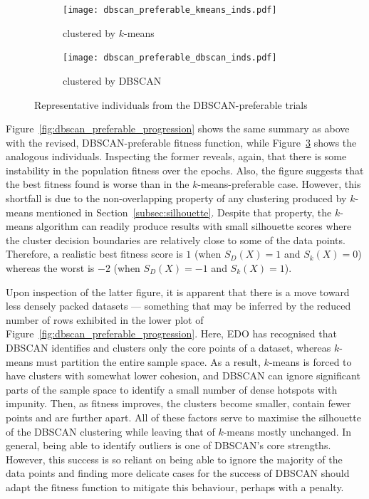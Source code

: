 \begin{figure}
    \centering
    \begin{subfigure}{\imgwidth}
        \centering
        \texttt{[image: dbscan\_preferable\_kmeans\_inds.pdf]}
        \caption{%
            clustered by \(k\)-means
        }\label{fig:dbscan_preferable_kmeans_inds}
    \end{subfigure}

    \vspace{1em}
    \begin{subfigure}{\imgwidth}
        \centering
        \texttt{[image: dbscan\_preferable\_dbscan\_inds.pdf]}
        \caption{clustered by DBSCAN}\label{fig:dbscan_preferable_dbscan_inds}
    \end{subfigure}
    \caption{%
        Representative individuals from the DBSCAN-preferable trials
    }\label{fig:dbscan_preferable_inds}
\end{figure}

Figure~\ref{fig:dbscan_preferable_progression} shows the same summary as above
with the revised, DBSCAN-preferable fitness function, while
Figure~\ref{fig:dbscan_preferable_inds} shows the analogous individuals.
Inspecting the former reveals, again, that there is some instability in the
population fitness over the epochs. Also, the figure suggests that the best
fitness found is worse than in the \(k\)-means-preferable case. However, this
shortfall is due to the non-overlapping property of any clustering produced by
\(k\)-means mentioned in Section~\ref{subsec:silhouette}. Despite that property,
the \(k\)-means algorithm can readily produce results with small silhouette
scores where the cluster decision boundaries are relatively close to some of the
data points. Therefore, a realistic best fitness score is \(1\) (when \(S_D(X) =
1\) and \(S_k(X) = 0\)) whereas the worst is \(-2\) (when \(S_D(X) = -1\) and
\(S_k(X) = 1\)).

Upon inspection of the latter figure, it is apparent that there is a move toward
less densely packed datasets --- something that may be inferred by the reduced
number of rows exhibited in the lower plot of
Figure~\ref{fig:dbscan_preferable_progression}. Here, EDO has recognised that
DBSCAN identifies and clusters only the core points of a dataset, whereas
\(k\)-means must partition the entire sample space. As a result, \(k\)-means is
forced to have clusters with somewhat lower cohesion, and DBSCAN can ignore
significant parts of the sample space to identify a small number of dense
hotspots with impunity. Then, as fitness improves, the clusters become smaller,
contain fewer points and are further apart. All of these factors serve to
maximise the silhouette of the DBSCAN clustering while leaving that of
\(k\)-means mostly unchanged. In general, being able to identify outliers is one
of DBSCAN's core strengths. However, this success is so reliant on being able to
ignore the majority of the data points and finding more delicate cases for the
success of DBSCAN should adapt the fitness function to mitigate this behaviour,
perhaps with a penalty.  

